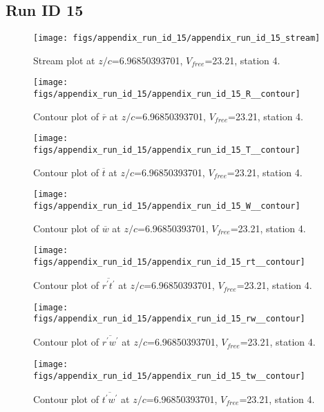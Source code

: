 \subsection{Run ID 15}
\begin{figure}[H]
\centering
\texttt{[image: figs/appendix\_run\_id\_15/appendix\_run\_id\_15\_stream]}
\caption{Stream plot at $z/c$=6.96850393701, $V_{free}$=23.21, station 4.}
\label{fig:appendix_run_id_15_stream}
\end{figure}


\begin{figure}[H]
\centering
\texttt{[image: figs/appendix\_run\_id\_15/appendix\_run\_id\_15\_R\_\_contour]}
\caption{Contour plot of $\overline{r}$ at $z/c$=6.96850393701, $V_{free}$=23.21, station 4.}
\label{fig:appendix_run_id_15_R__contour}
\end{figure}


\begin{figure}[H]
\centering
\texttt{[image: figs/appendix\_run\_id\_15/appendix\_run\_id\_15\_T\_\_contour]}
\caption{Contour plot of $\overline{t}$ at $z/c$=6.96850393701, $V_{free}$=23.21, station 4.}
\label{fig:appendix_run_id_15_T__contour}
\end{figure}


\begin{figure}[H]
\centering
\texttt{[image: figs/appendix\_run\_id\_15/appendix\_run\_id\_15\_W\_\_contour]}
\caption{Contour plot of $\overline{w}$ at $z/c$=6.96850393701, $V_{free}$=23.21, station 4.}
\label{fig:appendix_run_id_15_W__contour}
\end{figure}


\begin{figure}[H]
\centering
\texttt{[image: figs/appendix\_run\_id\_15/appendix\_run\_id\_15\_rt\_\_contour]}
\caption{Contour plot of $\overline{r^\prime t^\prime}$ at $z/c$=6.96850393701, $V_{free}$=23.21, station 4.}
\label{fig:appendix_run_id_15_rt__contour}
\end{figure}


\begin{figure}[H]
\centering
\texttt{[image: figs/appendix\_run\_id\_15/appendix\_run\_id\_15\_rw\_\_contour]}
\caption{Contour plot of $\overline{r^\prime w^\prime}$ at $z/c$=6.96850393701, $V_{free}$=23.21, station 4.}
\label{fig:appendix_run_id_15_rw__contour}
\end{figure}


\begin{figure}[H]
\centering
\texttt{[image: figs/appendix\_run\_id\_15/appendix\_run\_id\_15\_tw\_\_contour]}
\caption{Contour plot of $\overline{t^\prime w^\prime}$ at $z/c$=6.96850393701, $V_{free}$=23.21, station 4.}
\label{fig:appendix_run_id_15_tw__contour}
\end{figure}


